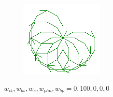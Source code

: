 \begin{figure}[H]
\begin{subfigure}[b]{0.1\textwidth}
    \end{subfigure}
    \begin{subfigure}[b]{0.1\textwidth}
        \includegraphics[width=\textwidth]{symm_only_dr2.png}
    \end{subfigure}
    \vspace{0.5cm}
    \caption{$w_{vt}, w_{bs}, w_{s}, w_{pha}, w_{bp} = 0, 100, 0, 0, 0$}
    \label{fig:subfigures}
\end{figure}

